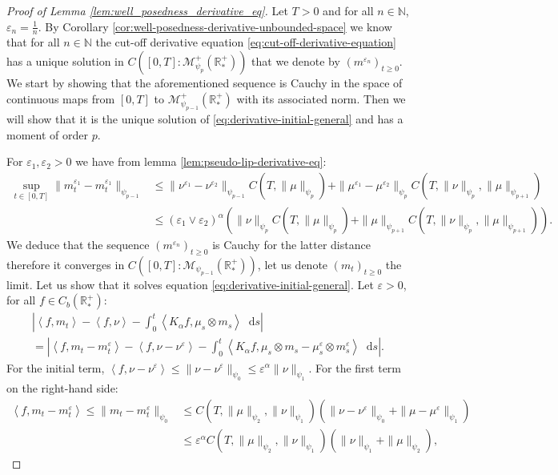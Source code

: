 \documentclass[11pt,a4paper]{article}
\newcommand{\NN}{\mathbb{N}}
\newcommand{\RRP}{\mathbb{R}^+_*}
\newcommand{\MC}{\mathcal{M}}
\newcommand{\Proc}[1]{\left(#1\right)_{t\geq 0}}
\newcommand{\brac}[1]{\left\langle#1\right\rangle}
\newcommand{\dd}{\mathop{}\!\mathrm{d}}
\begin{document}
\begin{proof}[Proof of Lemma \ref{lem:well_posedness_derivative_eq}]
    Let $T > 0$ and for all $n\in \NN$, $\varepsilon_n = \frac1n$. By Corollary \ref{cor:well-posedness-derivative-unbounded-space} we know that for all $n \in \NN$ the cut-off derivative equation \eqref{eq:cut-off-derivative-equation} has a unique solution in $C\left([0,T]: \MC_{\psi_{p}}^+ (\RRP)\right)$ that we denote by $\Proc{m^{\varepsilon_n}}$. We start by showing that the aforementioned sequence is Cauchy in the space of continuous maps from $[0,T]$ to $\MC_{\psi_{p-1}}^+ (\RRP)$ with its associated norm. Then we will show that it is the unique solution of \eqref{eq:derivative-initial-general} and has a moment of order $p$.
    
    For $\varepsilon_1, \varepsilon_2 > 0$ we have from lemma \ref{lem:pseudo-lip-derivative-eq}:
    \begin{align*}
        \sup\limits_{t\in [0,T]} \| m^{\varepsilon_1}_t - m^{\varepsilon_1}_t\|_{\psi_{p-1}} 
        &\leq \|\nu^{\varepsilon_1} - \nu^{\varepsilon_2}\|_{\psi_{p-1}} C(T,\|\mu\|_{\psi_{p}}) + \|\mu^{\varepsilon_1} - \mu^{\varepsilon_2}\|_{\psi_{p}}C(T,\|\nu\|_{\psi_p},\|\mu\|_{\psi_{p+1}}) \\
        &\leq \left(\varepsilon_1 \vee \varepsilon_2\right)^{\alpha} \left(\|\nu\|_{\psi_{p}} C(T,\|\mu\|_{\psi_{p}}) + \|\mu\|_{\psi_{p+1}}C(T,\|\nu\|_{\psi_p},\|\mu\|_{\psi_{p+1}})\right).
    \end{align*}
    We deduce that the sequence $\Proc{m^{\varepsilon_n}}$ is Cauchy for the latter distance therefore it converges in $C\left([0,T]:\MC_{\psi_{p-1}}(\RRP)\right)$, let us denote $\Proc{m_t}$ the limit. Let us show that it solves equation \eqref{eq:derivative-initial-general}. Let $\varepsilon > 0$, for all $f \in C_b(\RRP)$:
    \begin{multline*}
        \left| \brac{f,m_t} - \brac{f,\nu} - \int_0^t \brac{K_\alpha f,\mu_s \otimes m_s} \dd s\right|\\
        = \left| \brac{f,m_t- m^\varepsilon_t} - \brac{f,\nu - \nu^\varepsilon} - \int_0^t \brac{K_\alpha f,\mu_s \otimes m_s - \mu^\varepsilon_s \otimes m^\varepsilon_s} \dd s\right|.
    \end{multline*}
    For the initial term, $\brac{f,\nu - \nu^\varepsilon} \leq \|\nu - \nu^\varepsilon\|_{\psi_0} \leq \varepsilon^\alpha\|\nu\|_{\psi_1}$. For the first term on the right-hand side:
    \begin{align*}
        \brac{f,m_t- m^\varepsilon_t}\leq \|m_t - m_t^\varepsilon\|_{\psi_0} &\leq C(T,\|\mu\|_{\psi_2},\|\nu\|_{\psi_1}) \left(\|\nu- \nu^\varepsilon\|_{\psi_0} + \|\mu- \mu^\varepsilon\|_{\psi_1}\right)\\ &\leq \varepsilon^\alpha C(T,\|\mu\|_{\psi_2},\|\nu\|_{\psi_1}) \left(\|\nu\|_{\psi_1} + \|\mu\|_{\psi_2}\right),

\end{align*}
\end{proof}
\end{document}

